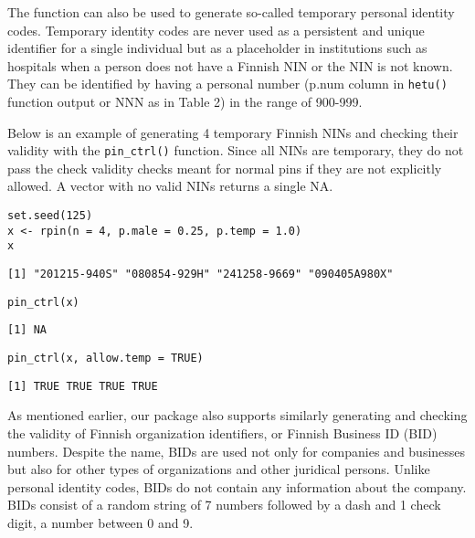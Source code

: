 The function can also be used to generate so-called temporary personal identity codes. Temporary identity codes are never used as a persistent and unique identifier for a single individual but as a placeholder in institutions such as hospitals when a person does not have a Finnish NIN or the NIN is not known. They can be identified by having a personal number (p.num column in \texttt{hetu()} function output or NNN as in Table 2) in the range of 900-999.

Below is an example of generating 4 temporary Finnish NINs and checking their validity with the \texttt{pin\_ctrl()} function. Since all NINs are temporary, they do not pass the check validity checks meant for normal pins if they are not explicitly allowed. A vector with no valid NINs returns a single NA.

\begin{verbatim}
set.seed(125)
x <- rpin(n = 4, p.male = 0.25, p.temp = 1.0)
x
\end{verbatim}

\begin{verbatim}
[1] "201215-940S" "080854-929H" "241258-9669" "090405A980X"
\end{verbatim}

\begin{verbatim}
pin_ctrl(x)
\end{verbatim}

\begin{verbatim}
[1] NA
\end{verbatim}

\begin{verbatim}
pin_ctrl(x, allow.temp = TRUE)
\end{verbatim}

\begin{verbatim}
[1] TRUE TRUE TRUE TRUE
\end{verbatim}

As mentioned earlier, our package also supports similarly generating and checking the validity of Finnish organization identifiers, or Finnish Business ID (BID) numbers. Despite the name, BIDs are used not only for companies and businesses but also for other types of organizations and other juridical persons. Unlike personal identity codes, BIDs do not contain any information about the company. BIDs consist of a random string of 7 numbers followed by a dash and 1 check digit, a number between 0 and 9.

